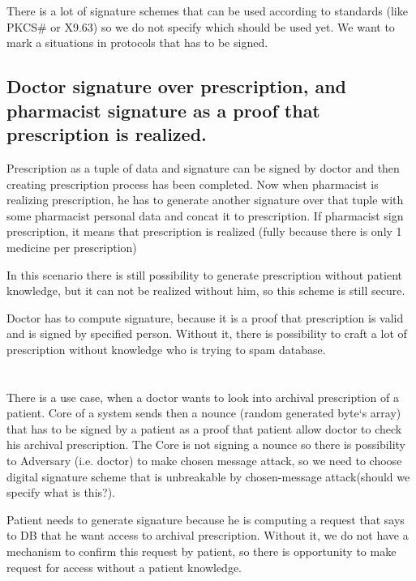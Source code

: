 \chapter {}
There is a lot of signature schemes that can be used according to standards (like PKCS\# or X9.63) so we do not specify which should be used yet. We want to mark a situations in protocols that has to be signed.
\section{Doctor signature over prescription, and pharmacist signature as a proof that prescription is realized.
}
Prescription as a tuple of data and signature can be signed by doctor and then creating prescription process has been completed. Now when pharmacist is realizing prescription, he has to generate another signature over that tuple with some pharmacist personal data and concat it to prescription. If pharmacist sign prescription, it means that prescription is realized (fully because there is only 1 medicine per prescription)

In this scenario there is still possibility to generate prescription without patient knowledge, but it can not be realized without him, so this scheme is still secure. 

Doctor has to compute signature, because it is a proof that prescription is valid and is signed by specified person. Without it, there is possibility to craft a lot of prescription without knowledge who is trying to spam database.

\chapter {}

There is a use case, when a doctor wants to look into archival prescription of a patient. Core of a system sends then a nounce (random generated byte`s array) that has to be signed by a patient as a proof that patient allow doctor to check his archival prescription. The Core is not signing a nounce so there is possibility to Adversary (i.e. doctor) to make chosen message attack, so we need to choose digital signature scheme that is unbreakable by chosen-message attack(should we specify what is this?). 

Patient needs to generate signature because he is computing a request that says to DB that he want access to archival prescription. Without it, we do not have a mechanism to confirm this request by patient, so there is opportunity to make request for access without a patient knowledge.

